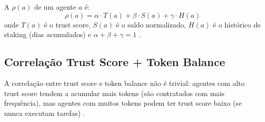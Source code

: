 \begin{definicao}
A  $\rho(a)$ de um agente $a$ é:
\[
\rho(a) = \alpha \cdot T(a) + \beta \cdot S(a) + \gamma \cdot H(a)
\]
onde $T(a)$ é o trust score, $S(a)$ é o saldo normalizado,
$H(a)$ é o histórico de staking (dias acumulados) e
$\alpha + \beta + \gamma = 1$ \cite{opencode2026token}.
\end{definicao}

\subsection{Correlação Trust Score + Token Balance}

A correlação entre trust score e token balance não é trivial:
agentes com alto trust score tendem a acumular mais tokens (são
contratados com mais frequência), mas agentes com muitos tokens
podem ter trust score baixo (se nunca executam tarefas)
\cite{opencode2026ecosystem}.

